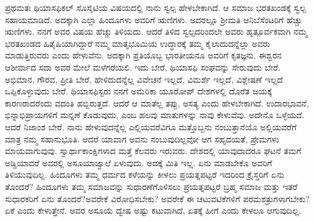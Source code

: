 ಪ್ರಥಮತಃ ಥಿಯಾಸಫಿಕಲ್​ ಸೊಸೈಟಿಯ ವಿಷಯದಲ್ಲಿ ನಾನು ಸ್ವಲ್ಪ ಹೇಳಬೇಕಾಗಿದೆ. ಆ ಸಮಾಜ ಭರತಖಂಡಕ್ಕೆ ಸ್ವಲ್ಪ ಸಹಾಯಮಾಡಿದೆ. ಅದಕ್ಕಾಗಿ ಎಲ್ಲಾ ಹಿಂದೂಗಳು ಅವರಿಗೆ ಋಣಿಗಳು. ಅದರಲ್ಲೂ ಶ‍್ರೀಮತಿ ಆನಿಬೆಸೆಂಟರಿಗೆ ಹೆಚ್ಚು ಋಣಿಗಳು. ನನಗೆ ಅವರ ವಿಷಯ ಹೆಚ್ಚು ತಿಳಿಯದು. ಆದರೆ ತಿಳಿದ ಸ್ವಲ್ಪದರಿಂದಲೇ ಅವರು ಹೃತ್ಪೂರ್ವಕವಾಗಿ ನಮ್ಮ ಭರತಖಂಡದ ಹಿತೈಷಿಯಾಗಿದ್ದಾರೆ ನಮ್ಮ ಮಾತೃಭೂಮಿಯ ಉದ್ಧಾರಕ್ಕೆ ತಮ್ಮ ಕೈಲಾದುದನ್ನೆಲ್ಲಾ ಅವರು ಮಾಡುತ್ತಿರುವರು ಎಂದು ಹೇಳುವೆನು. ಅದಕ್ಕಾಗಿ ಪ್ರತಿಯೊಬ್ಬ ಭಾರತೀಯನೂ ಅವರಿಗೆ ಕೃತಜ್ಞನು. ಈಶ್ವರನ ಆಶೀರ್ವಾದ ಸದಾ ಅವರ ಮೇಲೆ ಮಳೆಗರೆಯಲಿ. ಇದು ಬೇರೆ, ಥಿಯಾಸಫಿ ಸಂಘವನ್ನು ಸೇರುವುದು ಬೇರೆ. ಅಭಿಮಾನ, ಗೌರವ, ಪ್ರೀತಿ ಬೇರೆ, ಹೇಳಿದುದನ್ನೆಲ್ಲ ವಿವೇಚನೆ ಇಲ್ಲದೆ, ವಿಮರ್ಶೆ ಇಲ್ಲದೆ, ವಿಶ್ಲೇಷಣೆ ಇಲ್ಲದೆ ಒಪ್ಪಿಕೊಳ್ಳುವುದು ಬೇರೆ. ಥಿಯಾಸಫಿಸ್ಟರು ನನಗೆ ಅಮೆರಿಕಾ ಯೂರೋಪ್​ ದೇಶಗಳಲ್ಲಿ ದೊರೆತ ಜಯಕ್ಕೆ ಕಾರಣರಾದರೆಂದು ವದಂತಿ ಹಬ್ಬಿರುತ್ತದೆ. ಆದರೆ ಆ ಮಾತೆಲ್ಲ ತಪ್ಪು, ಅಸತ್ಯ ಎಂದು ಹೇಳಬೇಕಾಗಿದೆ. ಉದಾರಭಾವನೆ, ಭಿನ್ನಾಭಿಪ್ರಾಯಗಳಿಗೆ ಮನ್ನಣೆ ಕೊಡುವುದು, ಎಂಬ ಹಲವು ಮಾತುಗಳನ್ನು ನಾವು ಕೇಳುವೆವು. ಅದೇನೊ ಒಳ್ಳೆಯದೆ. ಆದರೆ ನಿಜಾಂಶ ಬೇರೆ. ನಾನು ಹೇಳುವುದನ್ನೆಲ್ಲ ಎಲ್ಲಿಯವರೆವಿಗೂ ಮತ್ತೊಬ್ಬನು ನಂಬುತ್ತಾನೆಯೊ ಅಲ್ಲಿಯವರೆಗೆ ಮಾತ್ರ ನಮ್ಮ ಸಹಾನುಭೂತಿ. ಆದರೆ ಯಾವಾಗ ಅವನು ನಂಬುವುದಿಲ್ಲವೋ ಆಗ ಸಹೃದಯತೆ, ಪ್ರೇಮಗಳು ಮಾಯವಾಗುವುವು. ಸ್ವಾರ್ಥಾಕಾಂಕ್ಷಿಗಳಾದ ಮತ್ತೆ ಕೆಲವರು ಇರುವರು. ದೇಶದಲ್ಲಿ ಯಾವುದಾದರೂ ಘಟನೆ ತಮಗೆ ಅಡ್ಡಿಯಾದರೆ ಅವರಲ್ಲಿ ಅಸೂಯಾಜ್ವಾಲೆ ಏಳುವುದು. ಅದಕ್ಕೆ ಮಿತಿ ಇಲ್ಲ. ಏನು ಮಾಡಬೇಕೊ ಅವರಿಗೆ ತಿಳಿಯುವುದಿಲ್ಲ. ಹಿಂದೂಗಳು ತಮ್ಮ ಧರ್ಮದ ಕಳೆಯನ್ನು ಕೀಳಲು ಪ್ರಯತ್ನಪಟ್ಟರೆ ಇದರಿಂದ ಕ್ರೈಸ್ತರಿಗೆ ಏನು ತೊಂದರೆ? ಹಿಂದೂಗಳು ತಮ್ಮ ಸಮಾಜವನ್ನು ಸುಧಾರಣೆಗೊಳಿಸಲು ಪ್ರಯತ್ನಪಟ್ಟರೆ ಬ್ರಹ್ಮ ಸಮಾಜ ಮತ್ತು ಇತರೆ ಸುಧಾರಕರಿಗೆ ಏನು ತೊಂದರೆ?\break ಅವರೇಕೆ ವಿರೋಧಿಸಬೇಕು? ಅವರೇಕೆ ಈ ಚಟುವಟಿಕೆಗಳಿಗೆ ಪರಮ\break ಶತ್ರುಗಳಾಗಬೇಕು? ಏಕೆ ಎಂದು ಕೇಳುತ್ತೇನೆ. ಅವರ ಅಸೂಯೆ ದ್ವೇಷ ಅಷ್ಟು ಕಟುವಾಗಿದೆ, ಏತಕ್ಕೆ ಹೀಗೆ ಎಂದು ಕೇಳಲೂ ಆಗುವುದಿಲ್ಲ.

